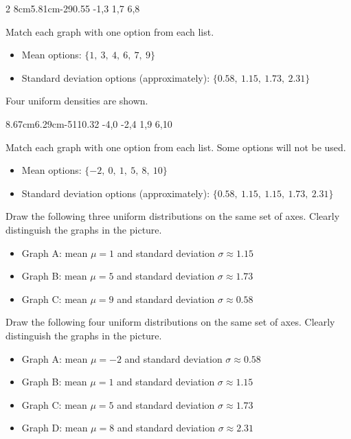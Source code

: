 \begin{multicols}{2}
		\vspace{-0.7cm}
		\UniformThreeGraph
		{8cm}{5.81cm}{-2}{9}{0.55}
		{-1,3}
		{1,7}
		{6,8}
		
		Match each graph with one option from each list.
		\begin{itemize}
			\item Mean options: $\{1,\ 3,\ 4,\ 6,\ 7,\ 9\}$
			\item Standard deviation options (approximately): $\{0.58,\ 1.15,\ 1.73,\ 2.31\}$
		\end{itemize}
		
		\vspace{-0.35cm}
		Four uniform densities are shown.
		
		\vspace{-0.7cm}
		\UniformFourGraph
		{8.67cm}{6.29cm}{-5}{11}{0.32}
		{-4,0}
		{-2,4}
		{1,9}
		{6,10}
		
		Match each graph with one option from each list. Some options will not be used.
		\begin{itemize}
			\item Mean options: $\{-2,\ 0,\ 1,\ 5,\ 8,\ 10\}$
			\item Standard deviation options (approximately): $\{0.58,\ 1.15,\ 1.15,\ 1.73,\ 2.31\}$
		\end{itemize}
		
		\vspace{-0.35cm}
		Draw the following three uniform distributions on the same set of axes. Clearly distinguish the graphs in the picture.
		\begin{itemize}
			\item Graph A: mean $\mu=1$ and standard deviation $\sigma\approx1.15$
			\item Graph B: mean $\mu=5$ and standard deviation $\sigma\approx1.73$
			\item Graph C: mean $\mu=9$ and standard deviation $\sigma\approx0.58$
		\end{itemize}
		
		\vspace{-0.35cm}
		Draw the following four uniform distributions on the same set of axes. Clearly distinguish the graphs in the picture.
		\begin{itemize}
			\item Graph A: mean $\mu=-2$ and standard deviation $\sigma\approx0.58$
			\item Graph B: mean $\mu=1$ and standard deviation $\sigma\approx1.15$
			\item Graph C: mean $\mu=5$ and standard deviation $\sigma\approx1.73$
			\item Graph D: mean $\mu=8$ and standard deviation $\sigma\approx2.31$
		\end{itemize}
		

\end{multicols}
